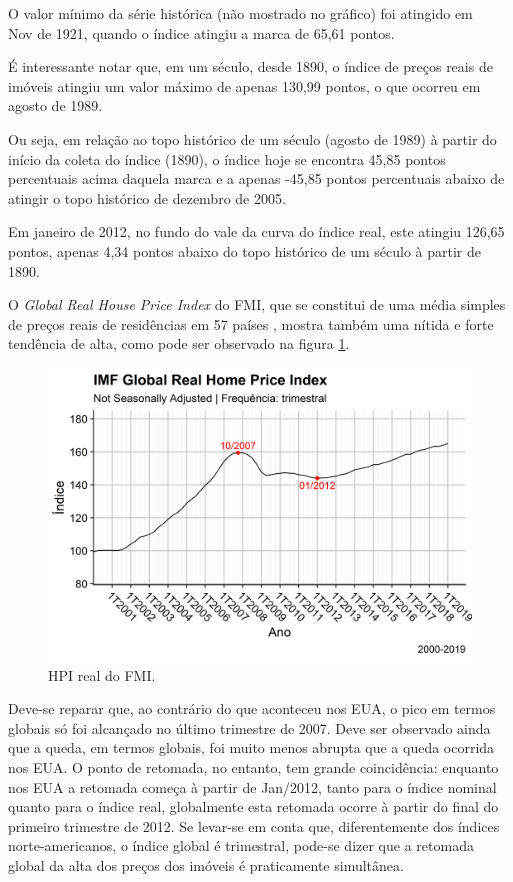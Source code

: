 \documentclass[
	12pt,				%
	oneside,			%
	a4paper,			%
	chapter=TITLE,		%
	section=TITLE,		%
	english,			%
	brazil				%
	]{abntex2}
\begin{document}
O valor mínimo da série histórica (não mostrado no gráfico) foi atingido
em\\
Nov de 1921, quando o índice atingiu a marca de 65,61 pontos.

É interessante notar que, em um século, desde 1890, o índice de preços
reais de imóveis atingiu um valor máximo de apenas 130,99 pontos, o que
ocorreu em agosto de 1989.

Ou seja, em relação ao topo histórico de um século (agosto de 1989) à
partir do início da coleta do índice (1890), o índice hoje se encontra
45,85 pontos percentuais acima daquela marca e a apenas -45,85 pontos
percentuais abaixo de atingir o topo histórico de dezembro de 2005.

Em janeiro de 2012, no fundo do vale da curva do índice real, este
atingiu 126,65 pontos, apenas 4,34 pontos abaixo do topo histórico de um
século à partir de 1890.

O \emph{Global Real House Price Index} do \gls{FMI}, que se constitui de
uma média simples de preços reais de residências em 57 países
\autocite{fmitwa}, mostra também uma nítida e forte tendência de alta,
como pode ser observado na figura \ref{fig:global-rhpi}.
\begin{figure}[H]

{\centering \includegraphics[width=0.7\linewidth]{images/global-rhpi-1} 

}

\caption{HPI real do FMI.}\label{fig:global-rhpi}
\end{figure}
Deve-se reparar que, ao contrário do que aconteceu nos EUA, o pico em
termos globais só foi alcançado no último trimestre de 2007. Deve ser
observado ainda que a queda, em termos globais, foi muito menos abrupta
que a queda ocorrida nos EUA. O ponto de retomada, no entanto, tem
grande coincidência: enquanto nos EUA a retomada começa à partir de
Jan/2012, tanto para o índice nominal quanto para o índice real,
globalmente esta retomada ocorre à partir do final do primeiro trimestre
de 2012. Se levar-se em conta que, diferentemente dos índices
norte-americanos, o índice global é trimestral, pode-se dizer que a
retomada global da alta dos preços dos imóveis é praticamente
simultânea.
\end{document}
